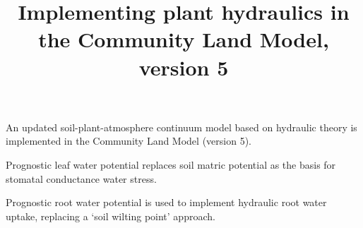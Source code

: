 \documentclass[draft,linenumbers]{agujournal}
\begin{document}
\title{Implementing plant hydraulics in the Community Land Model, version 5}



\begin{keypoints}
\item An updated soil-plant-atmosphere continuum model based on hydraulic theory is implemented in the Community Land Model (version 5).
\item Prognostic leaf water potential replaces soil matric potential as the basis for stomatal conductance water stress. 
\item Prognostic root water potential is used to implement hydraulic root water uptake, replacing a `soil wilting point' approach.
\end{keypoints}
\end{document}
